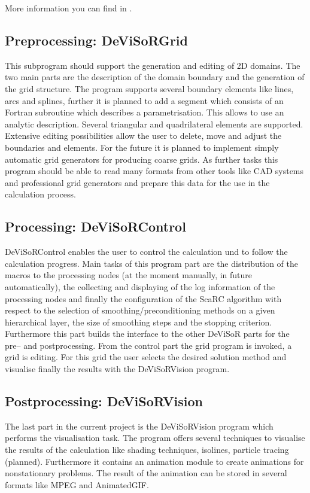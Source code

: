 More information you can find in \cite{PGDeViSoR2003}.

\subsection{Preprocessing: DeViSoRGrid}

This subprogram should support the generation and editing of 2D domains.
The two main parts are the description of the domain boundary and the 
generation of the grid structure. The program supports several boundary
elements like lines, arcs and splines, further it is planned to add a
segment which consists of an Fortran subroutine which describes a
parametrisation. This allows to use an analytic description. 
Several triangular and quadrilateral elements
are supported. Extensive editing possibilities allow the user to delete, move
and adjust the boundaries and elements. For the future it is planned to implement simply automatic grid generators
for producing coarse grids. As further tasks this program should be able to read many formats from
other tools like CAD systems and professional grid generators and prepare
this data for the use in the calculation process.

\subsection{Processing: DeViSoRControl}

DeViSoRControl enables the user to control the calculation und to follow the
calculation progress. Main tasks of this program part are the distribution
of the macros to the processing nodes (at the moment manually, in future
automa\-tically), the collecting and displaying of the log information of the
processing nodes and finally the configuration of the {\sc ScaRC} algorithm with
respect to the selection of smoothing/preconditioning methods on a given
hierarchical layer, the size of smoothing steps and the stopping criterion.
Furthermore this part builds the interface to the other DeViSoR parts for
the pre-- and postprocessing. From the control part the grid program is
invoked, a grid is editing. For this grid the user selects the desired
solution method and visualise finally the results with the DeViSoRVision
program.


\subsection{Postprocessing: DeViSoRVision}

The last part in the current project is the DeViSoRVision program which
performs the visualisation task. The program offers several techniques to
visualise the results of the calculation like shading techniques, isolines,
particle tracing (planned). Furthermore it contains an animation module to
create animations for nonstationary problems. The result of the animation
can be stored in several formats like MPEG and AnimatedGIF. 

